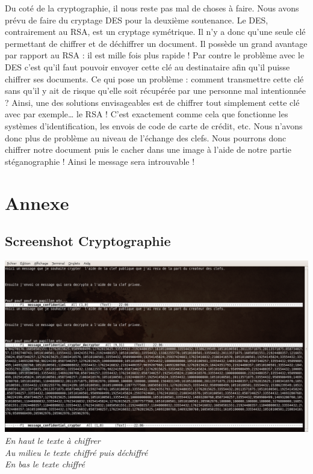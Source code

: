 \documentclass[a4paper,12pt]{article}
\begin{document}
\bigskip

Du coté de la cryptographie, il nous reste pas mal de choses à faire. Nous avons prévu de faire du cryptage DES pour la deuxième soutenance. Le DES, contrairement au RSA, est un cryptage symétrique. Il n'y a donc qu'une seule clé permettant de chiffrer et de déchiffrer un document. Il possède un grand avantage par rapport au RSA : il est mille fois plus rapide ! Par contre le problème avec le DES c'est qu'il faut pouvoir envoyer cette clé au destinataire afin qu'il puisse chiffrer ses documents. Ce qui pose un problème : comment transmettre cette clé sans qu'il y ait de risque qu'elle soit récupérée par une personne mal intentionnée ? Ainsi, une des solutions envisageables est de chiffrer tout simplement cette clé avec par exemple\ldots{} le RSA ! C'est exactement comme cela que fonctionne les systèmes d'identification, les envois de code de carte de crédit, etc. Nous n'avons donc plus de problème au niveau de l'échange des clefs. Nous pourrons donc chiffrer notre document puis le cacher dans une image à l'aide de notre partie stéganographie ! Ainsi le message sera introuvable !

\newpage

\section{Annexe}

\begin{landscape}
  \subsection {Screenshot Cryptographie}
  \begin{center}
    \includegraphics[scale=0.42]{cryptage.jpg}\\
    \textit{En haut le texte à chiffrer}\\
    \textit{Au milieu le texte chiffré puis déchiffré}\\
    \textit{En bas le texte chiffré}\\
  \end{center}
\end{landscape}

\newpage
\end{document}
